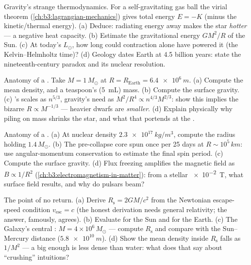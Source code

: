 \begin{exercise}[$\star\star$]\label{exo:b3:astrophysics:5}
Gravity's strange thermodynamics. For a self-gravitating gas
ball the virial theorem (\cref{ch:b3:lagrangian-mechanics})
gives total energy $E = -K$ (minus the kinetic/thermal energy).
(a) Deduce: radiating energy away makes the star \emph{hotter}
--- a negative heat capacity. (b) Estimate the gravitational
energy $GM^2/R$ of the Sun. (c) At today's $L_\odot$, how long
could contraction alone have powered it (the Kelvin--Helmholtz
time)? (d) Geology dates Earth at 4.5 billion years: state the
nineteenth-century paradox and its nuclear resolution.
\end{exercise}

\begin{exercise}[$\star\star$]\label{exo:b3:astrophysics:6}
Anatomy of a . Take $M = 1\,M_\odot$ at
$R = R_{\text{Earth}} = \qty{6.4e6}{m}$. (a) Compute the mean
density, and a teaspoon's (\qty{5}{mL}) mass. (b) Compute the
surface gravity. (c) 's
 scales as $n^{5/3}$, gravity's need as
$M^2/R^4 \propto n^{4/3}M^{2/3}$: show this implies the
bizarre $R \propto M^{-1/3}$ --- heavier dwarfs are
\emph{smaller}. (d) Explain physically why piling on mass
shrinks the star, and what that portends at the .
\end{exercise}

\begin{exercise}[$\star\star$]\label{exo:b3:astrophysics:7}
Anatomy of a . (a) At nuclear density
$\qty{2.3e17}{kg/m^3}$, compute the radius holding
$1.4\,M_\odot$. (b) The pre-collapse core spun once per 25 days
at $R \sim 10^5\,\unit{km}$: use angular-momentum conservation
to estimate the final spin period. (c) Compute the surface
gravity. (d) Flux freezing amplifies the magnetic field as
$B \propto 1/R^2$ (\cref{ch:b3:electromagnetism-in-matter}):
from a stellar \qty{e-2}{T}, what surface field results, and
why do pulsars beam?
\end{exercise}

\begin{exercise}[$\star\star$]\label{exo:b3:astrophysics:8}
The point of no return. (a) Derive $R_{\text{s}} = 2GM/c^2$ from
the Newtonian escape-speed condition $v_{\text{esc}} = c$ (the
honest derivation needs general relativity; the answer,
famously, agrees). (b) Evaluate for the Sun and for the Earth.
(c) The Galaxy's central : $M = 4\times10^6\,M_\odot$
--- compute $R_{\text{s}}$ and compare with the Sun--Mercury
distance ($\qty{5.8e10}{m}$). (d) Show the mean density inside
$R_{\text{s}}$ falls as $1/M^2$ --- a big enough  is
less dense than water: what does that say about ``crushing''
intuitions?
\end{exercise}

